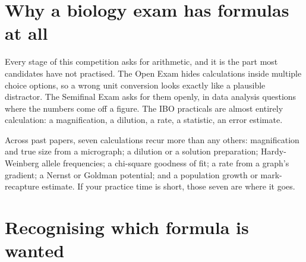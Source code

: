 \section{Why a biology exam has formulas at all}

Every stage of this competition asks for arithmetic, and it is the part most candidates
have not practised. The Open Exam hides calculations inside multiple choice options, so
a wrong unit conversion looks exactly like a plausible distractor. The Semifinal Exam
asks for them openly, in data analysis questions where the numbers come off a figure.
The IBO practicals are almost entirely calculation: a magnification, a dilution, a rate,
a statistic, an error estimate.

\begin{obsbox}[title={WORTH NOTICING: the recurring seven}]
Across past papers, seven calculations recur more than any others: magnification and
true size from a micrograph; a dilution or a solution preparation; Hardy-Weinberg allele
frequencies; a chi-square goodness of fit; a rate from a graph's gradient; a Nernst or
Goldman potential; and a population growth or mark-recapture estimate. If your practice
time is short, those seven are where it goes.
\end{obsbox}

\section{Recognising which formula is wanted}

